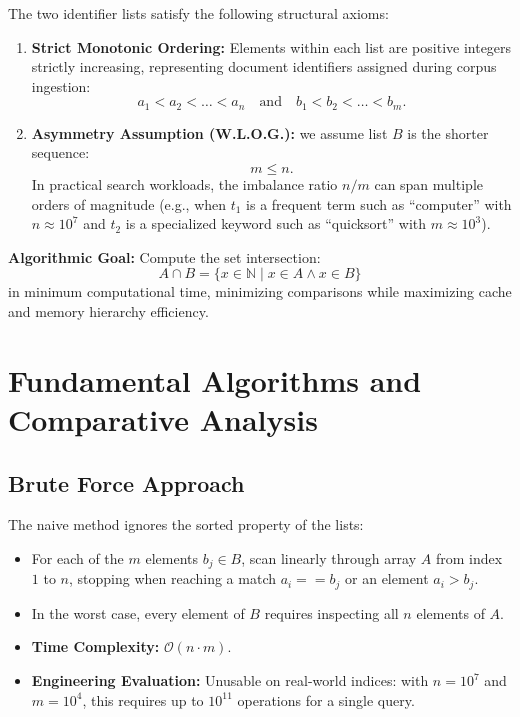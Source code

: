 \begin{property}
The two identifier lists satisfy the following structural axioms:
\begin{enumerate}
  \item \textbf{Strict Monotonic Ordering:} Elements within each list are positive integers strictly increasing, representing document identifiers assigned during corpus ingestion:
  \begin{equation}
    a_1 < a_2 < \dots < a_n \quad \text{and} \quad b_1 < b_2 < \dots < b_m.
  \end{equation}
  \item \textbf{Asymmetry Assumption (W.L.O.G.):} we assume list $B$ is the shorter sequence:
  \begin{equation}
    m \le n.
  \end{equation}
  In practical search workloads, the imbalance ratio $n/m$ can span multiple orders of magnitude (e.g., when $t_1$ is a frequent term such as ``computer'' with $n \approx 10^7$ and $t_2$ is a specialized keyword such as ``quicksort'' with $m \approx 10^3$).
\end{enumerate}
\end{property}

\textbf{Algorithmic Goal:} Compute the set intersection:
\begin{equation}
  A \cap B = \{x \in \mathbb{N} \mid x \in A \land x \in B\}
\end{equation}
in minimum computational time, minimizing comparisons while maximizing cache and memory hierarchy efficiency.

\FloatBarrier
\section{Fundamental Algorithms and Comparative Analysis}
\label{sec:fundamental-intersection-algorithms-en}

\subsection{Brute Force Approach}
The naive method ignores the sorted property of the lists:
\begin{itemize}
  \item For each of the $m$ elements $b_j \in B$, scan linearly through array $A$ from index $1$ to $n$, stopping when reaching a match $a_i == b_j$ or an element $a_i > b_j$.
  \item In the worst case, every element of $B$ requires inspecting all $n$ elements of $A$.
  \item \textbf{Time Complexity:} $\mathcal{O}(n \cdot m)$.
  \item \textbf{Engineering Evaluation:} Unusable on real-world indices: with $n = 10^7$ and $m = 10^4$, this requires up to $10^{11}$ operations for a single query.
\end{itemize}

